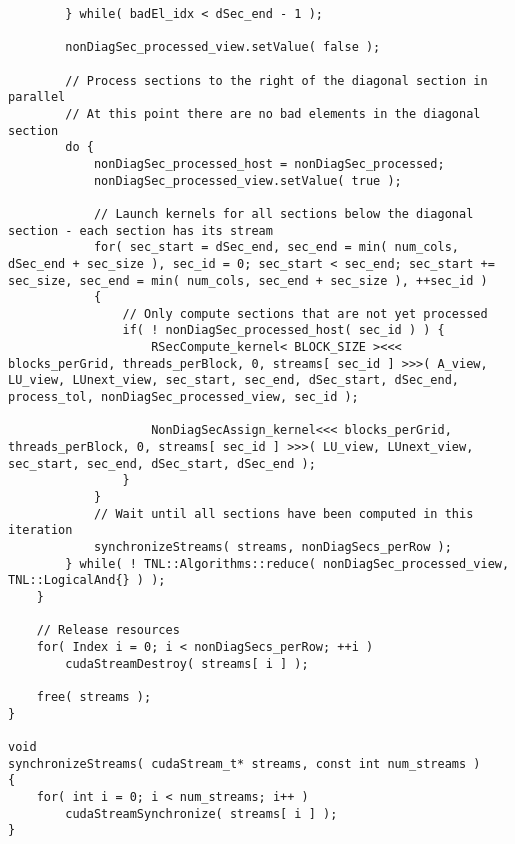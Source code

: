 \begin{lstlisting}
		} while( badEl_idx < dSec_end - 1 );
		
		nonDiagSec_processed_view.setValue( false );
		
		// Process sections to the right of the diagonal section in parallel
		// At this point there are no bad elements in the diagonal section
		do {
			nonDiagSec_processed_host = nonDiagSec_processed;
			nonDiagSec_processed_view.setValue( true );
			
			// Launch kernels for all sections below the diagonal section - each section has its stream
			for( sec_start = dSec_end, sec_end = min( num_cols, dSec_end + sec_size ), sec_id = 0; sec_start < sec_end; sec_start += sec_size, sec_end = min( num_cols, sec_end + sec_size ), ++sec_id )
			{
				// Only compute sections that are not yet processed
				if( ! nonDiagSec_processed_host( sec_id ) ) {
					RSecCompute_kernel< BLOCK_SIZE ><<< blocks_perGrid, threads_perBlock, 0, streams[ sec_id ] >>>( A_view, LU_view, LUnext_view, sec_start, sec_end, dSec_start, dSec_end, process_tol, nonDiagSec_processed_view, sec_id );
					
					NonDiagSecAssign_kernel<<< blocks_perGrid, threads_perBlock, 0, streams[ sec_id ] >>>( LU_view, LUnext_view, sec_start, sec_end, dSec_start, dSec_end );
				}
			}
			// Wait until all sections have been computed in this iteration
			synchronizeStreams( streams, nonDiagSecs_perRow );
		} while( ! TNL::Algorithms::reduce( nonDiagSec_processed_view, TNL::LogicalAnd{} ) );
	}
	
	// Release resources
	for( Index i = 0; i < nonDiagSecs_perRow; ++i )
		cudaStreamDestroy( streams[ i ] );
	
	free( streams );
}

void
synchronizeStreams( cudaStream_t* streams, const int num_streams )
{
	for( int i = 0; i < num_streams; i++ )
		cudaStreamSynchronize( streams[ i ] );
}
\end{lstlisting}

